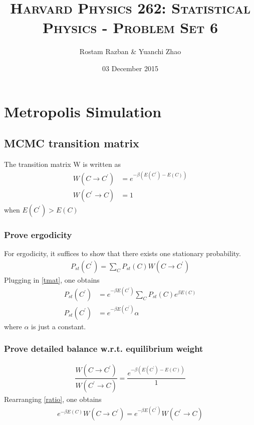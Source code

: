 \documentclass[11pt, letterpaper]{scrartcl} %
\title{	
\normalfont \normalsize 
\textsc{Harvard Physics 262: Statistical Physics - Problem Set 6} \\ [20pt] %
}
\author{Rostam Razban & Yuanchi Zhao} %
\date{\normalsize 03 December 2015} %
\numberwithin{equation}{section} %
\numberwithin{figure}{section} %
\numberwithin{table}{section} %
\begin{document}

\section{Metropolis Simulation}

\subsection{MCMC transition matrix}
The transition matrix W is written as
\begin{align}
W(C\rightarrow C^{'}) &= e^{-\beta (E(C^{'})-E(C))} \label{tmat}\\
W(C^{'}\rightarrow C) &= 1
\end{align}
when $E(C^{'})>E(C)$

\subsubsection{Prove ergodicity}
For ergodicity, it suffices to show that there exists one stationary probability.
\begin{align}
P_{st}(C^{'})=\sum\limits_{C} P_{st}(C)W(C\rightarrow C^{'}) 
\end{align}
Plugging in \ref{tmat}, one obtains
\begin{align}
P_{st}(C^{'})&=e^{-\beta E(C^{'})}\sum\limits_{C}  P_{st}(C) e^{\beta E(C)}\\
P_{st}(C^{'})&=e^{-\beta E(C^{'})}\alpha
\end{align}
where $\alpha$ is just a constant.
\subsubsection{Prove detailed balance w.r.t. equilibrium weight}
\begin{align}
\dfrac{W(C\rightarrow C^{'})}{W(C^{'}\rightarrow C)} = \dfrac{e^{-\beta (E(C^{'})-E(C))}}{1} \label{ratio}
\end{align}
Rearranging \ref{ratio}, one obtains
\begin{align}
e^{-\beta E(C)}W(C\rightarrow C^{'}) = e^{-\beta E(C^{'})}W(C^{'}\rightarrow C)
\end{align}
\end{document}
